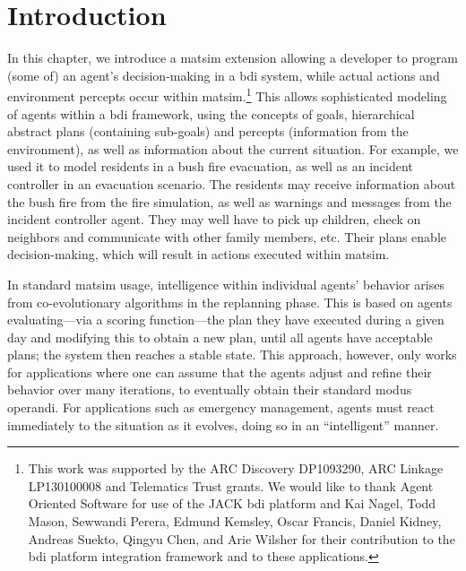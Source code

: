 \section{Introduction}
\label{sec:bdi-intro}
In this chapter, we introduce a \gls{matsim} extension allowing a
developer to program (some of) an agent's decision-making in a \gls{bdi} system, while actual actions and
environment percepts occur within \gls{matsim}.\footnote{This work was supported by the ARC Discovery DP1093290,  ARC Linkage LP130100008 and Telematics Trust grants. We would like to thank Agent Oriented Software for use of the JACK \gls{bdi} platform and Kai Nagel, Todd Mason, Sewwandi Perera, Edmund Kemsley, Oscar Francis, Daniel Kidney, Andreas Suekto, Qingyu Chen, and Arie Wilsher for their contribution to the \gls{bdi} platform integration framework and to these applications.} 
This allows
sophisticated modeling of agents within a \gls{bdi}
framework, using the concepts of goals, hierarchical abstract plans
(containing sub-goals) and percepts (information from the
environment), as well as information about the current situation. For
example, we used it to model residents in a 
bush fire evacuation, as well as an incident controller in an evacuation
scenario. The residents may receive information about the bush fire from
the fire simulation, as well as warnings and messages from the incident
controller agent. They may well have to
pick up children, check on neighbors and communicate with
other family members, etc. Their plans enable
decision-making, which will result in actions 
executed within \gls{matsim}.

In standard \gls{matsim} usage, intelligence within individual agents' behavior 
arises from co-evolutionary algorithms in
the replanning phase. This is based on agents evaluating---via a scoring
function---the plan they have executed during a given day and
modifying this to obtain a new plan, until all agents have acceptable
plans; the system then reaches a stable state. This approach, however,
only works for applications where one can assume that the agents
adjust and refine their behavior over many iterations, to eventually
obtain their standard modus operandi. For applications such as
emergency management, agents must react immediately to the situation
as it evolves, doing so in an ``intelligent'' manner. 

